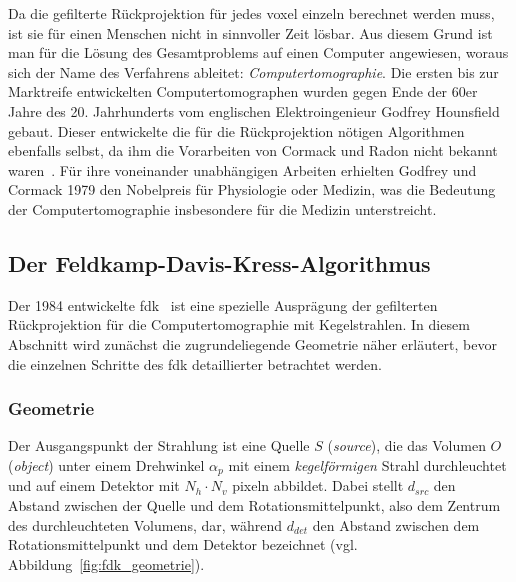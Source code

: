 Da die gefilterte Rückprojektion für jedes \gls{voxel} einzeln berechnet werden muss, ist sie für einen Menschen nicht
in sinnvoller Zeit lösbar. Aus diesem Grund ist man für die Lösung des Gesamtproblems auf einen Computer angewiesen,
woraus sich der Name des Verfahrens ableitet: \textit{Computertomographie}. Die ersten bis zur Marktreife entwickelten
Computertomographen wurden gegen Ende der 60er Jahre des 20. Jahrhunderts vom englischen Elektroingenieur Godfrey
Hounsfield gebaut. Dieser entwickelte die für die Rückprojektion nötigen Algorithmen ebenfalls selbst, da ihm die
Vorarbeiten von Cormack und Radon nicht bekannt waren~\cite{kalender}. Für ihre voneinander unabhängigen Arbeiten
erhielten Godfrey und Cormack 1979 den Nobelpreis für Physiologie oder Medizin, was die Bedeutung der
Computertomographie insbesondere für die Medizin unterstreicht.

\subsection{Der Feldkamp-Davis-Kress-Algorithmus}

Der 1984 entwickelte \gls{fdk}~\cite{fdk} ist eine spezielle Ausprägung der gefilterten Rückprojektion für die
Computertomographie mit Kegelstrahlen. In diesem Abschnitt wird zunächst die zugrundeliegende Geometrie näher erläutert,
bevor die einzelnen Schritte des \gls{fdk} detaillierter betrachtet werden.

\subsubsection{Geometrie}\label{sssec:fdk_geometrie}

 Der Ausgangspunkt der Strahlung ist eine Quelle $S$ (\textit{source}), die das
Volumen $O$ (\textit{object}) unter einem Drehwinkel $\alpha_p$ mit einem \textit{kegelförmigen} Strahl durchleuchtet
und auf einem Detektor mit $N_h \cdot N_v$ \gls{pixel}n abbildet. Dabei stellt $d_{src}$ den Abstand zwischen der Quelle
und dem Rotationsmittelpunkt, also dem Zentrum des durchleuchteten Volumens, dar, während $d_{det}$ den Abstand zwischen
dem Rotationsmittelpunkt und dem Detektor bezeichnet (vgl. Abbildung~\ref{fig:fdk_geometrie}).

